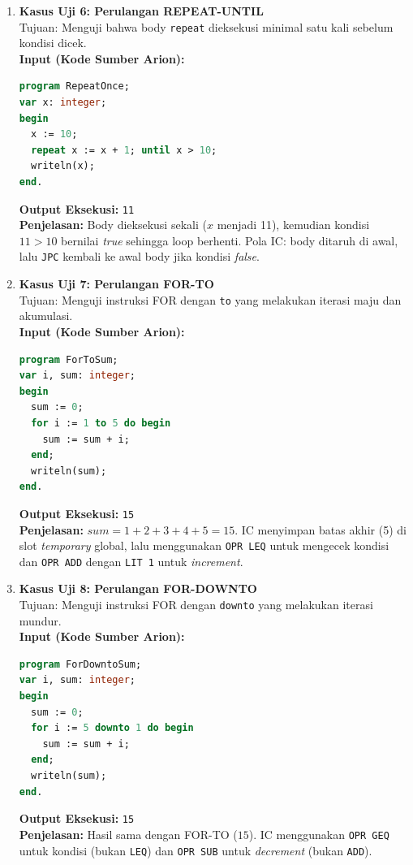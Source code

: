 \documentclass[12pt, a4paper]{article}
\begin{document}
\begin{enumerate}
    \item \textbf{Kasus Uji 6: Perulangan REPEAT-UNTIL} \\
    Tujuan: Menguji bahwa body \texttt{repeat} dieksekusi minimal satu kali sebelum kondisi dicek. \\
    \vspace{0.2cm}
    \textbf{Input (Kode Sumber Arion):}
\begin{lstlisting}[language=Pascal]
program RepeatOnce;
var x: integer;
begin
  x := 10;
  repeat x := x + 1; until x > 10;
  writeln(x);
end.
\end{lstlisting}
    \textbf{Output Eksekusi:} \texttt{11} \\
    \textbf{Penjelasan:} Body dieksekusi sekali ($x$ menjadi 11), kemudian kondisi $11 > 10$ bernilai \textit{true} sehingga loop berhenti. Pola IC: body ditaruh di awal, lalu \texttt{JPC} kembali ke awal body jika kondisi \textit{false}.
    \vspace{0.5cm}

    \item \textbf{Kasus Uji 7: Perulangan FOR-TO} \\
    Tujuan: Menguji instruksi FOR dengan \texttt{to} yang melakukan iterasi maju dan akumulasi. \\
    \vspace{0.2cm}
    \textbf{Input (Kode Sumber Arion):}
\begin{lstlisting}[language=Pascal]
program ForToSum;
var i, sum: integer;
begin
  sum := 0;
  for i := 1 to 5 do begin
    sum := sum + i;
  end;
  writeln(sum);
end.
\end{lstlisting}
    \textbf{Output Eksekusi:} \texttt{15} \\
    \textbf{Penjelasan:} $sum = 1+2+3+4+5 = 15$. IC menyimpan batas akhir (5) di slot \textit{temporary} global, lalu menggunakan \texttt{OPR LEQ} untuk mengecek kondisi dan \texttt{OPR ADD} dengan \texttt{LIT 1} untuk \textit{increment}.
    \vspace{0.5cm}

    \item \textbf{Kasus Uji 8: Perulangan FOR-DOWNTO} \\
    Tujuan: Menguji instruksi FOR dengan \texttt{downto} yang melakukan iterasi mundur. \\
    \vspace{0.2cm}
    \textbf{Input (Kode Sumber Arion):}
\begin{lstlisting}[language=Pascal]
program ForDowntoSum;
var i, sum: integer;
begin
  sum := 0;
  for i := 5 downto 1 do begin
    sum := sum + i;
  end;
  writeln(sum);
end.
\end{lstlisting}
    \textbf{Output Eksekusi:} \texttt{15} \\
    \textbf{Penjelasan:} Hasil sama dengan FOR-TO ($15$). IC menggunakan \texttt{OPR GEQ} untuk kondisi (bukan \texttt{LEQ}) dan \texttt{OPR SUB} untuk \textit{decrement} (bukan \texttt{ADD}).
    \vspace{0.5cm}


\end{enumerate}
\end{document}

